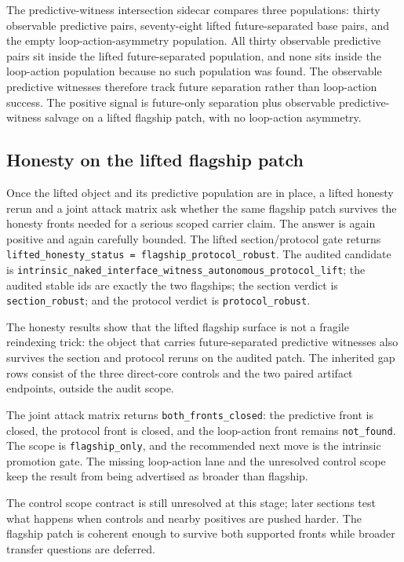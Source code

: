 \documentclass[11pt]{article}
\theoremstyle{definition}
\begin{document}
The predictive-witness intersection sidecar compares three populations: thirty
observable predictive pairs, seventy-eight lifted future-separated base pairs, and the
empty loop-action-asymmetry population. All thirty observable predictive pairs sit
inside the lifted future-separated population, and none sits inside the loop-action
population because no such population was found. The observable predictive witnesses
therefore track future separation rather than loop-action success. The positive signal
is future-only separation plus observable predictive-witness salvage on a lifted
flagship patch, with no loop-action asymmetry.

\subsection{Honesty on the lifted flagship patch}

Once the lifted object and its predictive population are in place, a lifted honesty rerun
and a joint attack matrix ask whether the same flagship patch survives the honesty fronts
needed for a serious scoped carrier claim. The answer is again positive and again
carefully bounded. The lifted section/protocol gate returns
\texttt{lifted\_honesty\_status = flagship\_protocol\_robust}. The audited candidate is
\nolinkurl{intrinsic_naked_interface_witness_autonomous_protocol_lift}; the audited
stable ids are exactly the two flagships; the section verdict is \texttt{section\_robust};
and the protocol verdict is \texttt{protocol\_robust}.

The honesty results show that the lifted flagship surface is not a fragile reindexing
trick: the object that carries future-separated predictive witnesses also survives the
section and protocol reruns on the audited patch. The inherited gap rows consist of
the three direct-core controls and the two paired artifact endpoints, outside the
audit scope.

The joint attack matrix returns \texttt{both\_fronts\_closed}: the predictive front is
closed, the protocol front is closed, and the loop-action front remains
\texttt{not\_found}. The scope is \texttt{flagship\_only}, and the recommended next
move is the intrinsic promotion gate. The missing loop-action lane and the unresolved
control scope keep the result from being advertised as broader than flagship.

The control scope contract is still unresolved at this stage; later sections test what
happens when controls and nearby positives are pushed harder. The flagship patch is
coherent enough to survive both supported fronts while broader transfer questions are
deferred.
\end{document}
